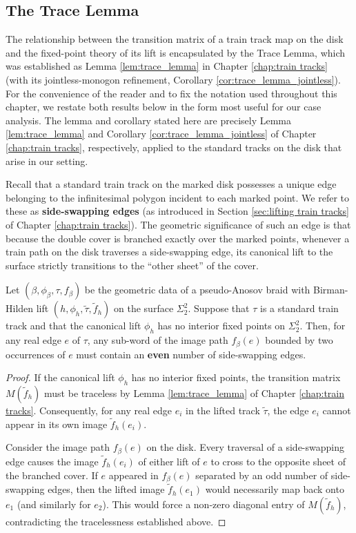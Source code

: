 \subsection{The Trace Lemma}

The relationship between the transition matrix of a train track map on the disk and the fixed-point theory of its lift is encapsulated by the Trace Lemma, which was established as Lemma \ref{lem:trace_lemma} in Chapter \ref{chap:train tracks} (with its jointless-monogon refinement, Corollary \ref{cor:trace_lemma_jointless}). For the convenience of the reader and to fix the notation used throughout this chapter, we restate both results below in the form most useful for our case analysis. The lemma and corollary stated here are precisely Lemma \ref{lem:trace_lemma} and Corollary \ref{cor:trace_lemma_jointless} of Chapter \ref{chap:train tracks}, respectively, applied to the standard tracks on the disk that arise in our setting.

Recall that a standard train track on the marked disk possesses a unique edge belonging to the infinitesimal polygon incident to each marked point. We refer to these as \textbf{side-swapping edges} (as introduced in Section \ref{sec:lifting train tracks} of Chapter \ref{chap:train tracks}). The geometric significance of such an edge is that because the double cover is branched exactly over the marked points, whenever a train path on the disk traverses a side-swapping edge, its canonical lift to the surface strictly transitions to the ``other sheet'' of the cover.

\begin{lemma}\label{lem:trace_lemma_downstairs}
Let $(\beta, \phi_\beta, \tau, f_\beta)$ be the geometric data of a pseudo-Anosov braid with Birman-Hilden lift $(h, \phi_h, \tilde{\tau}, \tilde{f}_h)$ on the surface $\Sigma_2^2$. Suppose that $\tau$ is a standard train track and that the canonical lift $\phi_h$ has no interior fixed points on $\Sigma_2^2$. Then, for any real edge $e$ of $\tau$, any sub-word of the image path $f_\beta(e)$ bounded by two occurrences of $e$ must contain an \textbf{even} number of side-swapping edges.
\end{lemma}

\begin{proof}
If the canonical lift $\phi_h$ has no interior fixed points, the transition matrix $M(\tilde{f}_h)$ must be traceless by Lemma \ref{lem:trace_lemma} of Chapter \ref{chap:train tracks}. Consequently, for any real edge $e_i$ in the lifted track $\tilde{\tau}$, the edge $e_i$ cannot appear in its own image $\tilde{f}_h(e_i)$.

Consider the image path $f_\beta(e)$ on the disk. Every traversal of a side-swapping edge causes the image $\tilde{f}_h(e_i)$ of either lift of $e$ to cross to the opposite sheet of the branched cover. If $e$ appeared in $f_\beta(e)$ separated by an odd number of side-swapping edges, then the lifted image $\tilde{f}_h(e_1)$ would necessarily map back onto $e_1$ (and similarly for $e_2$). This would force a non-zero diagonal entry of $M(\tilde{f}_h)$, contradicting the tracelessness established above.
\end{proof}

